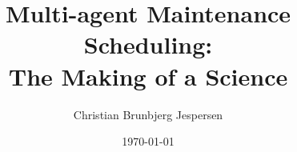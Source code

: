 \documentclass[12pt,oneside]{book}
\begin{document}
\title{Multi-agent Maintenance Scheduling: \\ The Making of a Science}
\author{Christian Brunbjerg Jespersen}
\date{\today}
\maketitle

\tableofcontents














\appendix





\end{document}
